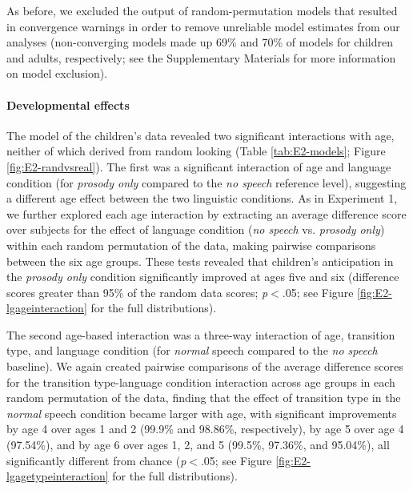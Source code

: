 \documentclass[authoryear, 12pt]{elsarticle}
\begin{document}
As before, we excluded the output of random-permutation models that resulted in convergence warnings in order to remove unreliable model estimates from our analyses (non-converging models made up 69\% and 70\% of models for children and adults, respectively; see the Supplementary Materials for more information on model exclusion).

\paragraph{Developmental effects}
The model of the children's data revealed two significant interactions with age, neither of which derived from random looking (Table \ref{tab:E2-models}; Figure \ref{fig:E2-randvsreal}). The first was a significant interaction of age and language condition (for \textit{prosody only} compared to the \textit{no speech} reference level), suggesting a different age effect between the two linguistic conditions. As in Experiment 1, we further explored each age interaction by extracting an average difference score over subjects for the effect of language condition (\textit{no speech} vs. \textit{prosody only}) within each random permutation of the data, making pairwise comparisons between the six age groups. These tests revealed that children's anticipation in the \textit{prosody only} condition significantly improved at ages five and six (difference scores greater than 95\% of the random data scores; \textit{p}$<$.05; see Figure \ref{fig:E2-lgageinteraction} for the full distributions).

The second age-based interaction was a three-way interaction of age, transition type, and language condition (for \textit{normal} speech compared to the \textit{no speech} baseline). We again created pairwise comparisons of the average difference scores for the transition type-language condition interaction across age groups in each random permutation of the data, finding that the effect of transition type in the \textit{normal} speech condition became larger with age, with significant improvements by age 4 over ages 1 and 2 (99.9\% and 98.86\%, respectively), by age 5 over age 4 (97.54\%), and by age 6 over ages 1, 2, and 5 (99.5\%, 97.36\%, and 95.04\%), all significantly different from chance (\textit{p}$<$.05; see Figure \ref{fig:E2-lgagetypeinteraction} for the full distributions).
\end{document}
